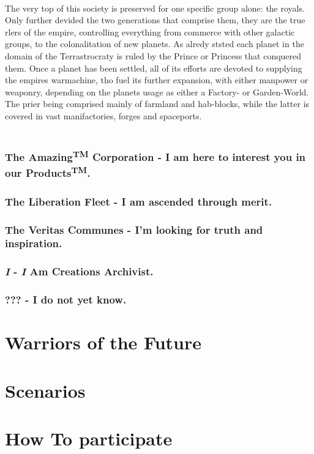 \documentclass[a4paper,12pt]{book}
\begin{document}
\\
The very top of this society is preserved for one specific group alone: the royals. Only further devided the two generations that comprise them, they are the true rlers of the empire, controlling everything from commerce with other galactic groups, to the colonalitation of new planets. As alredy ststed each planet in the domain of the Terrastrocraty is ruled by the Prince or Princess that conquered them. Once a planet has been settled, all of its efforts are devoted to supplying the empires warmachine, tho fuel its further expansion, with either manpower or weaponry, depending on the planets usage as either a Factory- or Garden-World. The prier being comprised mainly of farmland and hab-blocks, while the latter is covered in vast manifactories, forges and spaceports.\\
\\

\subsection{The Amazing\textsuperscript{TM} Corporation - I am here to interest you in our Products\textsuperscript{TM}.}

\subsection{The Liberation Fleet - I am ascended through merit.}

\subsection{The  Veritas Communes - I'm looking for truth and inspiration. }

\subsection{\textit{I} - \textit{I} Am Creations Archivist.}

\subsection{??? - I do not yet know.}

\chapter{Warriors of the Future}

\chapter{Scenarios}

\chapter{How To participate}
\end{document}
